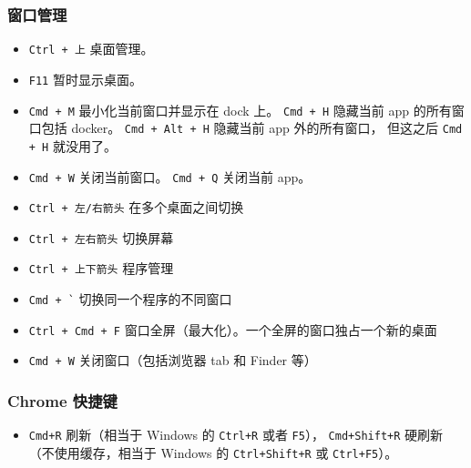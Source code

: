 \subsubsection{窗口管理}
\begin{itemize}
\item \verb|Ctrl + 上| 桌面管理。
\item \verb|F11| 暂时显示桌面。
\item \verb|Cmd + M| 最小化当前窗口并显示在 dock 上。 \verb`Cmd + H` 隐藏当前 app 的所有窗口包括 docker。 \verb`Cmd + Alt + H` 隐藏当前 app 外的所有窗口， 但这之后 \verb`Cmd + H` 就没用了。
\item \verb|Cmd + W| 关闭当前窗口。 \verb|Cmd + Q| 关闭当前 app。
\item \verb`Ctrl + 左/右箭头` 在多个桌面之间切换
\item \verb|Ctrl + 左右箭头| 切换屏幕
\item \verb|Ctrl + 上下箭头| 程序管理
\item \verb|Cmd + `| 切换同一个程序的不同窗口
\item \verb`Ctrl + Cmd + F` 窗口全屏（最大化）。一个全屏的窗口独占一个新的桌面
\item \verb`Cmd + W` 关闭窗口（包括浏览器 tab 和 Finder 等）
\end{itemize}

\subsubsection{Chrome 快捷键}
\begin{itemize}
\item \verb|Cmd+R| 刷新（相当于 Windows 的 \verb|Ctrl+R| 或者 \verb|F5|）， \verb|Cmd+Shift+R| 硬刷新（不使用缓存，相当于 Windows 的 \verb|Ctrl+Shift+R| 或 \verb|Ctrl+F5|）。
\end{itemize}

